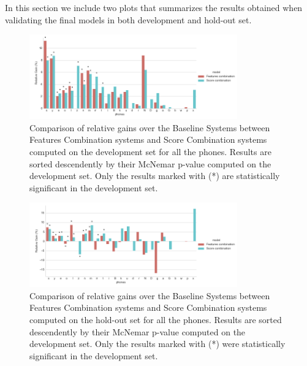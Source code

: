 In this section we include two plots that summarizes the results obtained when validating the final models in both development and hold-out set.

\begin{figure}[H]
	\centering
	\includegraphics[width=0.8\textwidth]{files/figures/results/relatives/relatives-fusion-systems-dev-all.png}
	\caption{Comparison of relative gains over the Baseline Systems
	between Features Combination systems and Score Combination systems
	computed on the development set for all the phones.
	Results are sorted descendently by their
	McNemar p-value computed on the development set.
	Only the results marked with (*) are statistically significant in the development set.}
	\label{fig:fusionAllDev}
\end{figure}

\begin{figure}[H]
	\centering
	\includegraphics[width=0.8\textwidth]{files/figures/results/relatives/relative-fusion-systems-heldout-all.png}
	\caption{
		Comparison of relative gains over the Baseline Systems
		between Features Combination systems and Score Combination systems
		computed on the hold-out set for all the phones.
		Results are sorted descendently by their
		McNemar p-value computed on the development set.
		Only the results marked with (*) were statistically significant in the development set.
	}
	\label{fig:fusionAllHeldout}
\end{figure}
